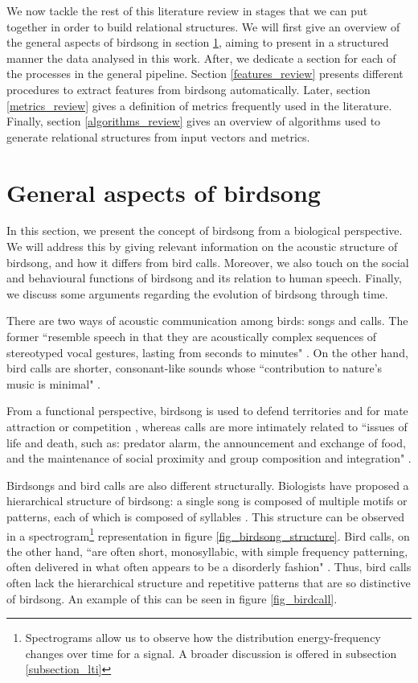 \documentclass[../main.tex]{subfiles} \label{chapter_soa}
\begin{document}
\par We now tackle the rest of this literature review in stages that we can put together in order to build relational structures. We will first give an overview of the general aspects of birdsong in section \ref{birdsong_review}, aiming to present in a structured manner the data analysed in this work. After, we dedicate a section for each of the processes in the general pipeline. Section \ref{features_review} presents different procedures to extract features from birdsong automatically. Later, section \ref{metrics_review} gives a definition of metrics frequently used in the literature. Finally, section \ref{algorithms_review} gives an overview of algorithms used to generate relational structures from input vectors and metrics.

\section{General aspects of birdsong} \label{birdsong_review}
In this section, we present the concept of birdsong from a biological perspective. We will address this by giving relevant information on the acoustic structure of birdsong, and how it differs from bird calls. Moreover, we also touch on the social and behavioural functions of birdsong and its relation to human speech. Finally, we discuss some arguments regarding the evolution of birdsong through time.
\par There are two ways of acoustic communication among birds: songs and calls. The former ``resemble speech in that they are acoustically complex sequences of stereotyped vocal gestures, lasting from seconds to minutes" \cite{Snowdon2013}. On the other hand, bird calls are shorter, consonant-like sounds whose ``contribution to nature's music is minimal" \cite{Marler2004}. 
\par From a functional perspective, birdsong is used to defend territories and for mate attraction or competition \cite{Berwick2013} \cite{Naguib2014}, whereas calls are more intimately related to ``issues of life and death, such as: predator alarm, the announcement and exchange of food, and the maintenance of social proximity and group composition and integration" \cite{Marler2004}.
\par Birdsongs and bird calls are also different structurally. Biologists have proposed a hierarchical structure of birdsong: a single song is composed of multiple motifs or patterns, each of which is composed of syllables \cite{Snowdon2013}. This structure can be observed in a spectrogram\footnote{Spectrograms allow us to observe how the distribution energy-frequency changes over time for a signal. A broader discussion is offered in subsection \ref{subsection_lti}} representation in figure \ref{fig_birdsong_structure}. Bird calls, on the other hand, ``are often short, monosyllabic, with simple frequency patterning, often delivered in what often appears to be a disorderly fashion" \cite{Marler2004}. Thus, bird calls often lack the hierarchical structure and repetitive patterns that are so distinctive of birdsong. An example of this can be seen in figure \ref{fig_birdcall}.
\end{document}
